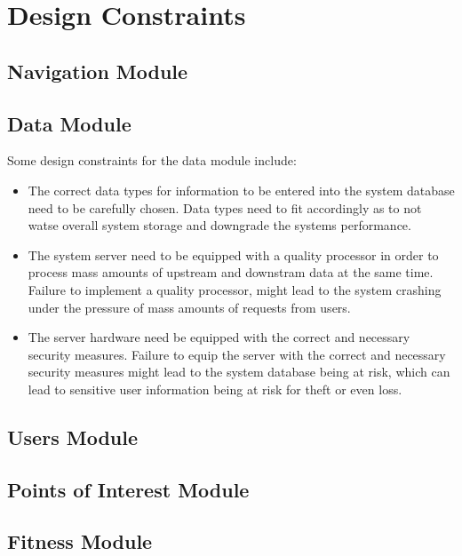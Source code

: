 \documentclass[11pt]{article}
\begin{document}
\section{Design Constraints}

\subsection{Navigation Module}

\subsection{Data Module}
Some design constraints for the data module include:
  \begin{itemize}

      \item The correct data types for information to be entered into the system database need to be carefully chosen. 
    Data types need to fit accordingly as to not watse overall system storage and downgrade the systems performance.

      \item The system server need to be equipped with a quality processor in order to process mass amounts of upstream and downstram data at the same time.
    Failure to implement a quality processor, might lead to the system crashing under the pressure of mass amounts of requests from users.

    \item The server hardware need be equipped with the correct and necessary security measures.
    Failure to equip the server with the correct and necessary security measures might lead to the system database being at risk,
    which can lead to sensitive user information being at risk for theft or even loss.

  \end{itemize}
  
  \subsection{Users Module}
  
  \subsection{Points of Interest Module}
  
  \subsection{Fitness Module}

  
 
\end{document}
